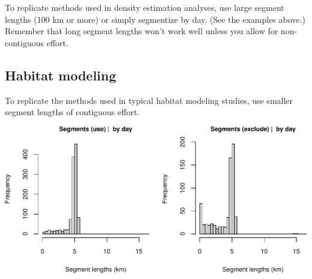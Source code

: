 \documentclass[
]{book}
\newenvironment{Shaded}{\begin{snugshade}}{\end{snugshade}}
\newcommand{\CommentTok}[1]{\textcolor[rgb]{0.56,0.35,0.01}{\textit{#1}}}
\newcommand{\DataTypeTok}[1]{\textcolor[rgb]{0.13,0.29,0.53}{#1}}
\newcommand{\DecValTok}[1]{\textcolor[rgb]{0.00,0.00,0.81}{#1}}
\newcommand{\FloatTok}[1]{\textcolor[rgb]{0.00,0.00,0.81}{#1}}
\newcommand{\KeywordTok}[1]{\textcolor[rgb]{0.13,0.29,0.53}{\textbf{#1}}}
\newcommand{\NormalTok}[1]{#1}
\newcommand{\OperatorTok}[1]{\textcolor[rgb]{0.81,0.36,0.00}{\textbf{#1}}}
\newcommand{\OtherTok}[1]{\textcolor[rgb]{0.56,0.35,0.01}{#1}}
\newcommand{\StringTok}[1]{\textcolor[rgb]{0.31,0.60,0.02}{#1}}
\begin{document}
To replicate methods used in density estimation analyses, use large segment lengths (100 km or more) or simply segmentize by day. (See the examples above.) Remember that long segment lengths won't work well unless you allow for non-contiguous effort.

\hypertarget{habitat-modeling}{%
\subsection*{Habitat modeling}\label{habitat-modeling}}

To replicate the methods used in typical habitat modeling studies, use smaller segment lengths of contiguous effort.

\begin{Shaded}
\end{Shaded}

\includegraphics{figures/unnamed-chunk-370-1.pdf}
\end{document}
